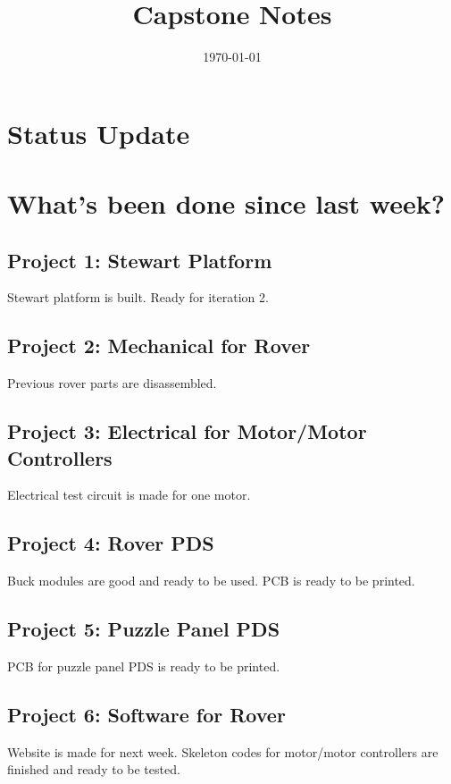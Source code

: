 \documentclass[a4paper, 10pt]{article}
\title{Capstone Notes}
\date{\today}
\begin{document}
\maketitle

\section*{Status Update}



\section*{What's been done since last week?}
	\subsection*{Project 1: Stewart Platform}
	Stewart platform is built. Ready for iteration 2.
		
	\subsection*{Project 2: Mechanical for Rover}
	Previous rover parts are disassembled.
	
	\subsection*{Project 3: Electrical for Motor/Motor Controllers}
	Electrical test circuit is made for one motor.
		
	\subsection*{Project 4: Rover PDS}	
	Buck modules are good and ready to be used. PCB is ready to be printed.
		
	\subsection*{Project 5: Puzzle Panel PDS}
	PCB for puzzle panel PDS is ready to be printed.
		
	\subsection*{Project 6: Software for Rover}
	Website is made for next week. Skeleton codes for motor/motor controllers are finished and ready to be tested.
		
\end{document}
